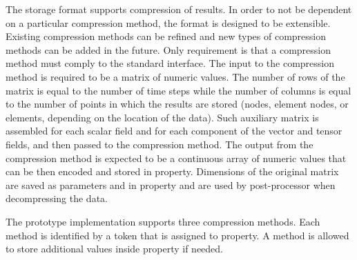 The storage format supports compression of results. In order to not be dependent on a particular compression method, the format is designed to be extensible. Existing compression methods can be refined and new types of compression methods can be added in the future. Only requirement is that a compression method must comply to the standard interface. The input to the compression method is required to be a matrix of numeric values. The number of rows of the matrix is equal to the number of time steps while the number of columns is equal to the number of points in which the results are stored (nodes, element nodes, or elements, depending on the location of the data). Such auxiliary matrix is assembled for each scalar field and for each component of the vector and tensor fields, and then passed to the compression method. The output from the compression method is expected to be a continuous array of numeric values that can be then encoded and stored in  property. Dimensions of the original matrix are saved as parameters  and  in  property and are used by post-processor when decompressing the data.

The prototype implementation supports three compression methods. Each method is identified by a token that is assigned to  property. A method is allowed to store additional values inside  property if needed.

